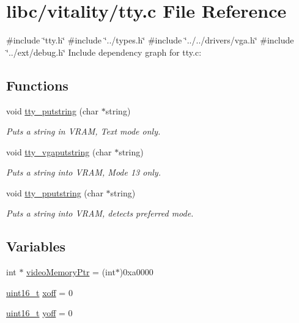\hypertarget{a00080}{}\section{libc/vitality/tty.c File Reference}
\label{a00080}
{\ttfamily \#include \char`\"{}tty.\+h\char`\"{}}\newline
{\ttfamily \#include \char`\"{}../types.\+h\char`\"{}}\newline
{\ttfamily \#include \char`\"{}../../drivers/vga.\+h\char`\"{}}\newline
{\ttfamily \#include \char`\"{}../ext/debug.\+h\char`\"{}}\newline
Include dependency graph for tty.\+c\+:
\subsection*{Functions}
\begin{DoxyCompactItemize}
\item 
void \hyperlink{a00080_a2ebb962f457a2677d70285d1c0f9be12_a2ebb962f457a2677d70285d1c0f9be12}{tty\+\_\+putstring} (char $\ast$string)
\begin{DoxyCompactList}\small\item\em Puts a string in V\+R\+AM, Text mode only. \end{DoxyCompactList}\item 
void \hyperlink{a00080_a13ff2c06d56753c5666ca56cb2d81100_a13ff2c06d56753c5666ca56cb2d81100}{tty\+\_\+vgaputstring} (char $\ast$string)
\begin{DoxyCompactList}\small\item\em Puts a string into V\+R\+AM, Mode 13 only. \end{DoxyCompactList}\item 
void \hyperlink{a00080_ade960b1320324706aac6c00cc6b1b2fe_ade960b1320324706aac6c00cc6b1b2fe}{tty\+\_\+pputstring} (char $\ast$string)
\begin{DoxyCompactList}\small\item\em Puts a string into V\+R\+AM, detects preferred mode. \end{DoxyCompactList}\end{DoxyCompactItemize}
\subsection*{Variables}
\begin{DoxyCompactItemize}
\item 
int $\ast$ \hyperlink{a00080_a3f896e9c00b9302e2287aad054199134_a3f896e9c00b9302e2287aad054199134}{video\+Memory\+Ptr} = (int$\ast$)0xa0000
\item 
\hyperlink{a00068_a273cf69d639a59973b6019625df33e30_a273cf69d639a59973b6019625df33e30}{uint16\+\_\+t} \hyperlink{a00080_abaa0d20f0e52ce0d3a7d706f6ac16266_abaa0d20f0e52ce0d3a7d706f6ac16266}{xoff} = 0
\item 
\hyperlink{a00068_a273cf69d639a59973b6019625df33e30_a273cf69d639a59973b6019625df33e30}{uint16\+\_\+t} \hyperlink{a00080_a1a7539764d0ae8cd06ce45c62cf92bca_a1a7539764d0ae8cd06ce45c62cf92bca}{yoff} = 0
\end{DoxyCompactItemize}


